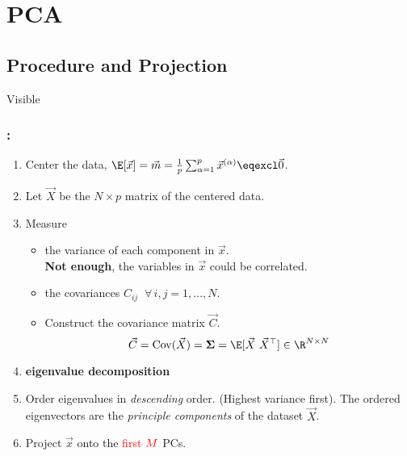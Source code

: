\section{PCA}


\subsection{Procedure and Projection}

\begin{frame}{Visible}\frametitle{\secname: \subsecname}

\begin{enumerate}
	\item<visible@1-> Center the data, $\E\lbrack\vec x\rbrack = \vec m  = \frac{1}{p} \sum_{\alpha=1}^{p} \vec x^{(\alpha)}\eqexcl \vec 0$.
	\item<visible@3-> Let $\vec X$ be the $N \times p$ matrix of the centered data.
	\item<visible@4-> Measure
	\begin{itemize}
	\item the variance of each component in $\vec x$.\\
	\textbf{Not enough}, the variables in $\vec x$ could be correlated.
	\item the covariances $C_{ij} \;\; \forall\,i,j = 1,\ldots,N$.
	\item<visible@4->[$\Rightarrow$] Construct the covariance matrix $\vec C$.
		\begin{equation}
		\vec C = \text{Cov}(\vec X) = \mathbf{\Sigma} = \E\lbrack\vec X~\vec X^\top\rbrack \in \R^{N \times N}
		\end{equation}
	\end{itemize}
	\svspace{-5mm}
	\item<visible@6-> \textbf{eigenvalue decomposition}
	\item<visible@7-> Order eigenvalues in \emph{descending} order. (Highest variance first). The ordered eigenvectors are the \emph{principle components} of the dataset $\vec X$.
	\item<visible@8-> Project $\vec x$ onto the \textcolor{red}{first} $\color{red}M$ PCs.
\end{enumerate}


\end{frame}

